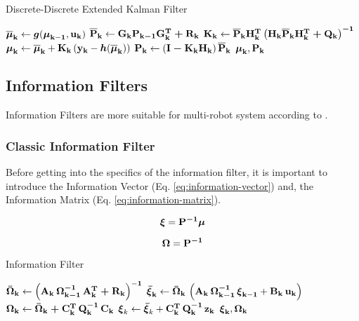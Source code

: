 \documentclass[12pt]{article}
\begin{document}
\begin{algorithm}[h]
\caption{Discrete-Discrete Extended Kalman Filter}
\label{alg:ekf}
\begin{algorithmic}[1]
\State ${\boldsymbol{\overline{\mu}}}_\mathbf{k} \gets {\boldsymbol{g}}({\boldsymbol{\mu}}_\mathbf{k-1}, \boldsymbol{\mathbf{u_k}})$ 
\State $\boldsymbol{\mathbf{\overline{P}_k}} \gets \boldsymbol{\mathbf{G_k P_{k-1} G^T_k + R_k}}$ 
\State $\boldsymbol{\mathbf{K_k}} \gets \boldsymbol{\mathbf{\overline{P}_k H^T_k \left(H_k \overline{P}_k H^T_k + Q_k\right)^{-1}}}$ 
\State ${\boldsymbol{\mu}}_\mathbf{k} \gets {\boldsymbol{\overline{\mu}}}_\mathbf{k} + \boldsymbol{\mathbf{K_k}} \left(\boldsymbol{\mathbf{y_k}} - {\boldsymbol{h}}({\boldsymbol{\overline{\mu}}}_\mathbf{k})\right)$ 
\State $\boldsymbol{\mathbf{P_k}} \gets \left(\boldsymbol{\mathbf{I - K_k H_k}}\right) \boldsymbol{\mathbf{\overline{P}_k}}$ 
\State \Return ${\boldsymbol{\mu}}_\mathbf{k}, \boldsymbol{\mathbf{P_k}}$
\EndProcedure
\end{algorithmic}
\end{algorithm}

\subsection{Information Filters}
Information Filters are more suitable for multi-robot system according to \cite[p.~78]{bongard2006probabilistic}.


\subsubsection{Classic Information Filter}
Before getting into the specifics of the information filter, it is important to introduce the Information Vector (Eq. \ref{eq:information-vector}) and, the Information Matrix (Eq. \ref{eq:information-matrix}).

\begin{equation}
    {\boldsymbol{\xi}} = \boldsymbol{\mathbf{P^{-1}}} {\boldsymbol{\mu}}
    \label{eq:information-vector}
\end{equation}

\begin{equation}
    \boldsymbol{\mathbf{\Omega}} = \boldsymbol{\mathbf{P^{-1}}}    
    \label{eq:information-matrix}
\end{equation}

\begin{algorithm}[h]
\caption{Information Filter}
\label{alg:information-filter}
\begin{algorithmic}[1]
\State $\boldsymbol{\mathbf{\bar{\Omega}_k}} \gets \left(\boldsymbol{\mathbf{A_k\, \Omega_{k-1}^{-1}\,A_k^T + R_k}}\right)^\mathbf{-1}$
\State ${\boldsymbol{\bar{\xi}}}_{\mathbf{k}} \gets \boldsymbol{\mathbf{\bar{\Omega}_k}}\,\left(\boldsymbol{\mathbf{A_k\, \Omega_{k-1}^{-1}}}\,{\boldsymbol{\xi}}_\mathbf{k-1} + \boldsymbol{\mathbf{B_k \,u_k}}\right)$
\State $\boldsymbol{\mathbf{\Omega_k}} \gets \boldsymbol{\mathbf{\bar{\Omega}_k + C_k^T\, Q_k^{-1}\, C_k}}$
\State ${\boldsymbol{\xi}}_k \gets {\boldsymbol{\bar{\xi}}}_k + \boldsymbol{\mathbf{C_k^T\, Q_k^{-1}}} \,\boldsymbol{\mathbf{z_k}}$
\State \Return ${\boldsymbol{\xi}}_\mathbf{k}, \boldsymbol{\mathbf{\Omega_k}}$
\EndProcedure
\end{algorithmic}
\end{algorithm}
\end{document}
